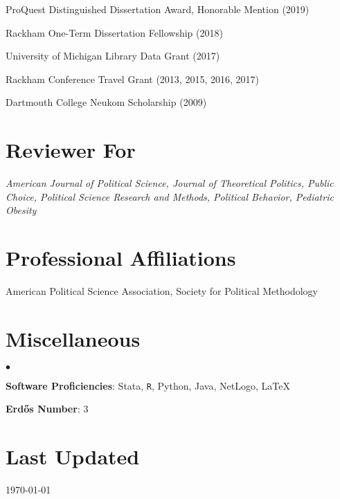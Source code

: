 \documentclass[margin,line]{res}
\newenvironment{list2}{
  \begin{list}{$\bullet$}{%
      \setlength{\itemsep}{0in}
      \setlength{\parsep}{0in} \setlength{\parskip}{0in}
      \setlength{\topsep}{0in} \setlength{\partopsep}{0in} 
      \setlength{\leftmargin}{0.2in}}}{\end{list}}
\begin{document}
\begin{resume}
ProQuest Distinguished Dissertation Award, Honorable Mention (2019)

Rackham One-Term Dissertation Fellowship (2018)

University of Michigan Library Data Grant (2017)

Rackham Conference Travel Grant (2013, 2015, 2016, 2017)

Dartmouth College Neukom Scholarship (2009)



\section{\sc Reviewer For}
\textit{American Journal of Political Science, Journal of Theoretical Politics, Public Choice, Political Science Research and Methods, Political Behavior, Pediatric Obesity}

\section{\sc Professional Affiliations}
American Political Science Association, Society for Political Methodology





\section{\sc Miscellaneous}
\begin{list2}
	\item \textbf{Software Proficiencies}: Stata, {\tt R}, Python, Java, NetLogo, \LaTeX
	\item \textbf{Erd{\H o}s Number}: 3
\end{list2}


\section{\sc Last Updated}
\today

%

\end{resume}
\end{document}
